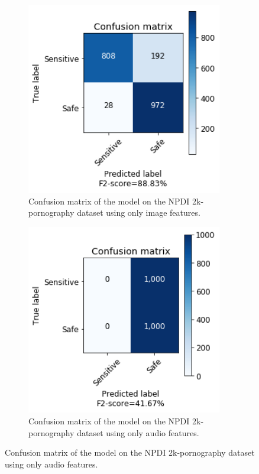 \begin{figure}[!ht]
    \centering
    \begin{subfigure}[b]{0.49\textwidth}
        \includegraphics[width=0.94\textwidth]{img/results/MLP-2K-TEST-IMAGE-ONLY.png}
        \caption{Confusion matrix of the model on the NPDI 2k-pornography dataset using only image features.}
        \label{fig:cf-test-2k-image}
    \end{subfigure}
    \begin{subfigure}[b]{0.49\textwidth}
        \includegraphics[width=0.94\textwidth]{img/results/MLP-2K-TEST-AUDIO-ONLY.png}
        \caption{Confusion matrix of the model on the NPDI 2k-pornography dataset using only audio features.}
        \label{fig:cf-test-2k-audio}
    \end{subfigure}
\end{figure}


